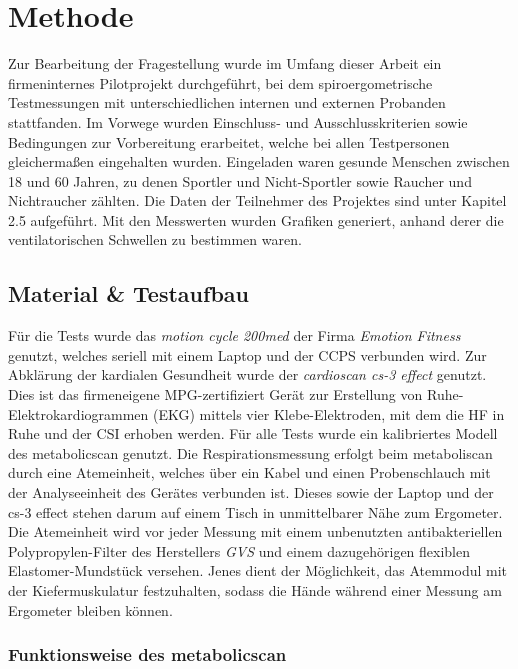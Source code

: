 \chapter{Methode}

Zur Bearbeitung der Fragestellung wurde im Umfang dieser Arbeit ein firmeninternes Pilotprojekt durchgeführt, bei dem spiroergometrische Testmessungen mit unterschiedlichen internen und externen Probanden stattfanden. Im Vorwege wurden Einschluss- und Ausschlusskriterien sowie Bedingungen zur Vorbereitung erarbeitet, welche bei allen Testpersonen gleichermaßen eingehalten wurden. Eingeladen waren gesunde Menschen zwischen 18 und 60 Jahren, zu denen Sportler und Nicht-Sportler sowie Raucher und Nichtraucher zählten. Die Daten der Teilnehmer des Projektes sind unter Kapitel 2.5 aufgeführt. Mit den Messwerten wurden Grafiken generiert, anhand derer die ventilatorischen Schwellen zu bestimmen waren.

\section{Material \& Testaufbau}

Für die Tests wurde das \textsl{motion cycle 200med} der Firma \textsl{Emotion Fitness} genutzt, welches seriell mit einem Laptop und der \acs{CCPS} verbunden wird. Zur Abklärung der kardialen Gesundheit wurde der \textsl{cardioscan cs-3 effect} genutzt. Dies ist das firmeneigene MPG-zertifiziert Gerät zur Erstellung von Ruhe-Elektrokardiogrammen (\acs{EKG}) mittels vier Klebe-Elektroden, mit dem die \ac{HF} in Ruhe und der \ac{CSI} erhoben werden. Für alle Tests wurde ein kalibriertes Modell des metabolicscan genutzt. Die Respirationsmessung erfolgt beim metaboliscan durch eine Atemeinheit, welches über ein Kabel und einen Probenschlauch mit der Analyseeinheit des Gerätes verbunden ist. Dieses sowie der Laptop und der cs-3 effect stehen darum auf einem Tisch in unmittelbarer Nähe zum Ergometer. Die Atemeinheit wird vor jeder Messung mit einem unbenutzten antibakteriellen Polypropylen-Filter des Herstellers \textsl{GVS} und einem dazugehörigen flexiblen Elastomer-Mundstück versehen. Jenes dient der Möglichkeit, das Atemmodul mit der Kiefermuskulatur festzuhalten, sodass die Hände während einer Messung am Ergometer bleiben können.

\subsection{Funktionsweise des metabolicscan}

